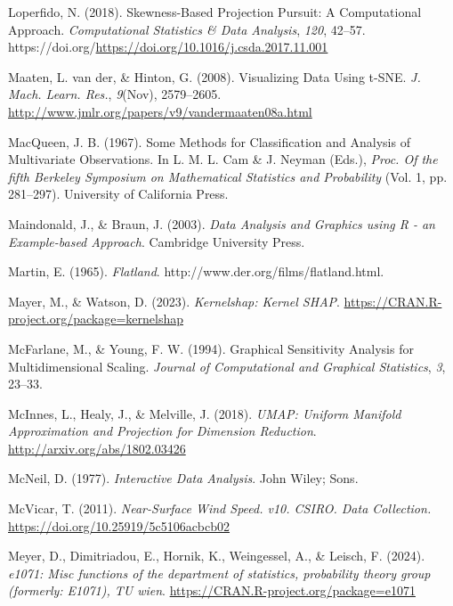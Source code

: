 \documentclass[
  letterpaper,
]{krantz}
\newlength{\cslhangindent}
\newenvironment{CSLReferences}[2] %
 {\begin{list}{}{%
  \setlength{\itemindent}{0pt}
  \setlength{\leftmargin}{0pt}
  \setlength{\parsep}{0pt}
  \ifodd #1
   \setlength{\leftmargin}{\cslhangindent}
   \setlength{\itemindent}{-1\cslhangindent}
  \fi
  \setlength{\itemsep}{#2\baselineskip}}}
 {\end{list}}
\begin{document}
\begin{CSLReferences}{1}{0}
Loperfido, N. (2018). Skewness-{B}ased {P}rojection {P}ursuit: A
{C}omputational {A}pproach. \emph{Computational Statistics \& Data
Analysis}, \emph{120}, 42--57.
https://doi.org/\url{https://doi.org/10.1016/j.csda.2017.11.001}

Maaten, L. van der, \& Hinton, G. (2008). Visualizing {D}ata {U}sing
{t-SNE}. \emph{J. Mach. Learn. Res.}, \emph{9}(Nov), 2579--2605.
\url{http://www.jmlr.org/papers/v9/vandermaaten08a.html}

MacQueen, J. B. (1967). Some {M}ethods for {C}lassification and
{A}nalysis of {M}ultivariate {O}bservations. In L. M. L. Cam \& J.
Neyman (Eds.), \emph{Proc. Of the fifth {B}erkeley {S}ymposium on
{M}athematical {S}tatistics and {P}robability} (Vol. 1, pp. 281--297).
University of California Press.

Maindonald, J., \& Braun, J. (2003). \emph{Data {A}nalysis and
{G}raphics using {R} - an {E}xample-based {A}pproach}. Cambridge
University Press.

Martin, E. (1965). \emph{Flatland}.
http://www.der.org/films/flatland.html.

Mayer, M., \& Watson, D. (2023). \emph{Kernelshap: Kernel SHAP}.
\url{https://CRAN.R-project.org/package=kernelshap}

McFarlane, M., \& Young, F. W. (1994). Graphical {S}ensitivity
{A}nalysis for {M}ultidimensional {S}caling. \emph{Journal of
Computational and Graphical Statistics}, \emph{3}, 23--33.

McInnes, L., Healy, J., \& Melville, J. (2018). \emph{{UMAP}: {U}niform
{M}anifold {A}pproximation and {P}rojection for {D}imension
{R}eduction}. \url{http://arxiv.org/abs/1802.03426}

McNeil, D. (1977). \emph{Interactive {D}ata {A}nalysis}. John Wiley;
Sons.

McVicar, T. (2011). \emph{Near-{S}urface {W}ind {S}peed. v10. CSIRO.
{D}ata {C}ollection.} \url{https://doi.org/10.25919/5c5106acbcb02}

Meyer, D., Dimitriadou, E., Hornik, K., Weingessel, A., \& Leisch, F.
(2024). \emph{e1071: Misc functions of the department of statistics,
probability theory group (formerly: E1071), TU wien}.
\url{https://CRAN.R-project.org/package=e1071}


\end{CSLReferences}
\end{document}
